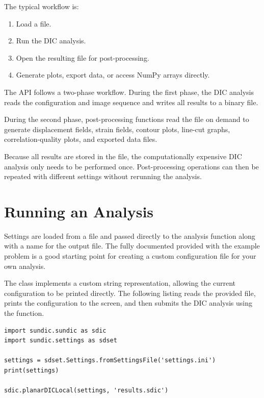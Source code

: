 \noindent
The typical workflow is:

\begin{enumerate}
	\item Load a  file.
	\item Run the DIC analysis.
	\item Open the resulting  file for post-processing.
	\item Generate plots, export data, or access NumPy arrays directly.
\end{enumerate}

The API follows a two-phase workflow. During the first phase, the DIC analysis reads the configuration and image sequence and writes all results to a binary  file.

During the second phase, post-processing functions read the  file
on demand to generate displacement fields, strain fields, contour plots,
line-cut graphs, correlation-quality plots, and exported data files.

Because all results are stored in the  file, the computationally
expensive DIC analysis only needs to be performed once. Post-processing
operations can then be repeated with different settings without rerunning the
analysis.

\section{Running an Analysis}

Settings are loaded from a  file and passed directly to the
analysis function along with a name for the output file. The fully documented
 provided with the example problem is a good starting point
for creating a custom configuration file for your own analysis.

The  class implements a custom string representation, allowing the current configuration to be printed directly. The following listing reads the provided
 file, prints the configuration to the screen, and then
submits the DIC analysis using the  function.


\begin{lstlisting}
import sundic.sundic as sdic
import sundic.settings as sdset

settings = sdset.Settings.fromSettingsFile('settings.ini')
print(settings)

sdic.planarDICLocal(settings, 'results.sdic')
\end{lstlisting}

